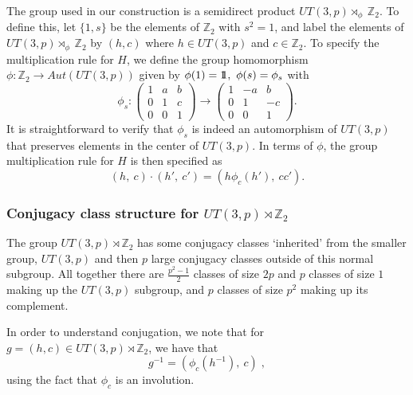 \documentclass[12pt]{article}
\theoremstyle{definition}
\def\identity{{\rlap{1} \hskip 1.6pt \hbox{1}}}
\begin{document}
The group used in our construction is a semidirect product $UT(3,p) \rtimes_{\phi}~\mathbb{Z}_2$. To define this, let $\{1,s\}$ be the elements of $\mathbb{Z}_2$ with $s^2 = 1$, and label the elements of $UT(3,p) \rtimes_{\phi}~\mathbb{Z}_2$ by $(h,c)$ where $h \in UT(3,p)$ and $c \in \mathbb{Z}_2$. To specify the multiplication rule for $H$, we define
the group homomorphism $\phi: \mathbb{Z}_2 \rightarrow Aut(UT(3,p))$ given by $\phi(1) = \identity,~\phi(s) = \phi_{s}$ with
\begin{equation}
\phi_{s} :
\begin{pmatrix}
1 & a & b \\
0 & 1 & c \\
0 & 0 & 1
\end{pmatrix}
\rightarrow
\begin{pmatrix}
1 & -a & b \\
0 & 1 & -c \\
0 & 0 & 1
\end{pmatrix}.
\end{equation}
It is straightforward to verify that $\phi_s$ is indeed an automorphism of $UT(3,p)$ that preserves elements in the center of $UT(3,p)$. In terms of $\phi$, the group multiplication rule for $H$ is then specified as
\begin{equation}
(h,~c) \cdot (h',~c') = (h \phi_c (h'),~cc').
\end{equation}

\subsubsection*{Conjugacy class structure for $UT(3,p) \rtimes \mathbb{Z}_2$}

The group $UT(3,p) \rtimes \mathbb{Z}_2$ has some conjugacy classes `inherited' from the smaller group, $UT(3,p)$ and then $p$ large conjugacy classes outside of this normal subgroup. All together there are $\frac{p^2-1}{2}$ classes of size $2p$ and $p$ classes of size $1$ making up the $UT(3,p)$ subgroup, and $p$ classes of size $p^2$ making up its complement.

\vspace{2mm}
In order to understand conjugation, we note that for $g = (h,c) \in UT(3,p) \rtimes \mathbb{Z}_2$, we have that
\begin{equation}
g^{-1}  = (\phi_c (h^{-1}),~c) \; ,
\end{equation}
using the fact that $\phi_c$ is an involution.
\end{document}
